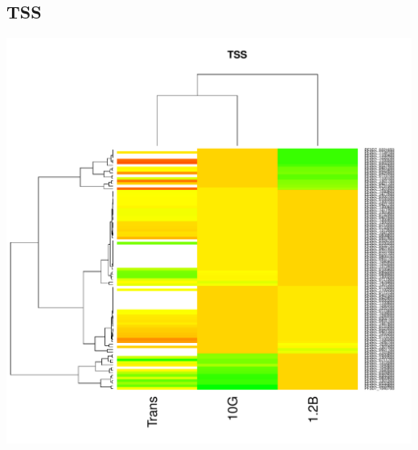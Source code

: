 \documentclass{article}\usepackage[]{graphicx}\usepackage[]{color}
\newenvironment{knitrout}{}{} %
\begin{document}
\subsection{TSS}
\begin{knitrout}
\color{fgcolor}

{\centering \includegraphics[width=.9\linewidth]{figure/minimal-heatmap_tss-1} 

}



\end{knitrout}
\clearpage
\end{document}
